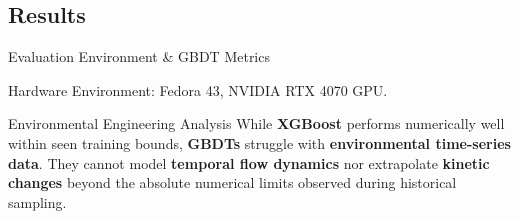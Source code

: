 \documentclass[xcolor=dvipsnames]{beamer}
\begin{document}
\subsection{Results}
\begin{frame}{Evaluation Environment \& GBDT Metrics}
  \begin{block}{Hardware}
    Environment: Fedora 43, NVIDIA RTX 4070 GPU.
  \end{block}
  
  \begin{table}
      \centering
      \caption{\textbf{GBDT Metrics} (CAWW\_29)}
  \end{table}
  \vspace{-0.3cm}
  \begin{block}{Environmental Engineering Analysis}
      \small
      While \textbf{XGBoost} performs numerically well within seen training bounds, \textbf{GBDTs} struggle with \textbf{environmental time-series data}. They cannot model \textbf{temporal flow dynamics} nor extrapolate \textbf{kinetic changes} beyond the absolute numerical limits observed during historical sampling.
  \end{block}
\end{frame}
\end{document}
